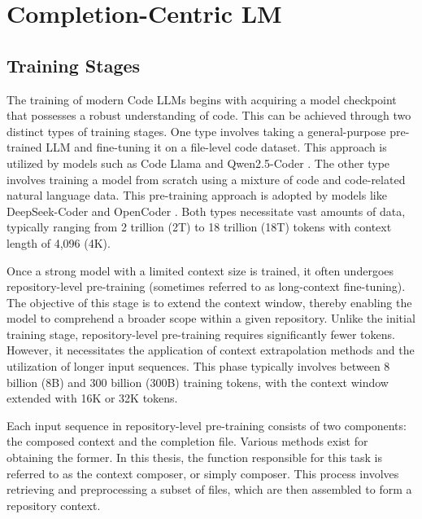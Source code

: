 \chapter{Completion-Centric LM}\label{chap:completion-centric-lm}


\section{Training Stages}\label{sec:training-stages}

The training of modern Code LLMs begins with acquiring a model checkpoint that possesses a robust understanding of code. This can be achieved through two distinct types of training stages. One type involves taking a general-purpose pre-trained LLM and fine-tuning it on a file-level code dataset. This approach is utilized by models such as Code Llama \parencite{rozière2023} and Qwen2.5-Coder \parencite{hui2024}. The other type involves training a model from scratch using a mixture of code and code-related natural language data. This pre-training approach is adopted by models like DeepSeek-Coder \parencite{guo2024} and OpenCoder \parencite{huang2024}. Both types necessitate vast amounts of data, typically ranging from 2 trillion (2T) to 18 trillion (18T) tokens with context length of 4,096 (4K). 

Once a strong model with a limited context size is trained, it often undergoes repository-level pre-training (sometimes referred to as long-context fine-tuning). The objective of this stage is to extend the context window, thereby enabling the model to comprehend a broader scope within a given repository. Unlike the initial training stage, repository-level pre-training requires significantly fewer tokens. However, it necessitates the application of context extrapolation methods and the utilization of longer input sequences. This phase typically involves between 8 billion (8B) and 300 billion (300B) training tokens, with the context window extended with 16K or 32K tokens.


Each input sequence in repository-level pre-training consists of two components: the composed context and the completion file. Various methods exist for obtaining the former. In this thesis, the function responsible for this task is referred to as the context composer, or simply composer. This process involves retrieving and preprocessing a subset of files, which are then assembled to form a repository context.

